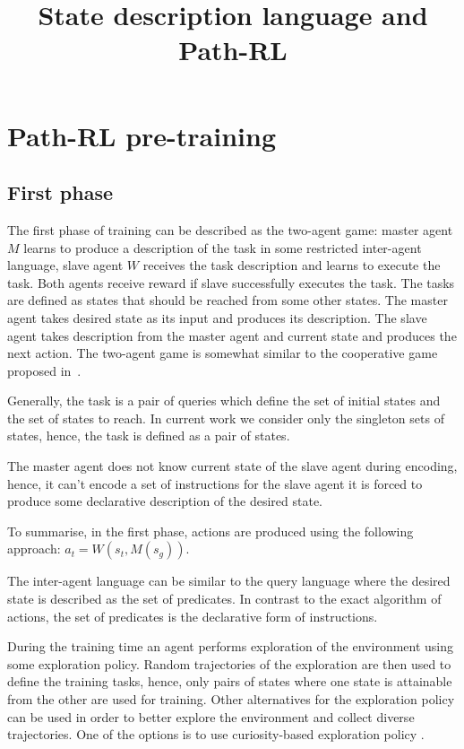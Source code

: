 \documentclass{article}
\title{State description language and Path-RL}
\author{}
\date{}
\begin{document}
\maketitle

\section{Path-RL pre-training}

\subsection{First phase}

The first phase of training can be described as the two-agent game: master agent $M$ learns to produce a description of the task in some restricted inter-agent language, slave agent $W$ receives the task description and learns to execute the task. Both agents receive reward if slave successfully executes the task. The tasks are defined as states that should be reached from some other states. The master agent takes desired state as its input and produces its description. The slave agent takes description from the master agent and current state and produces the next action. The two-agent game is somewhat similar to the cooperative game proposed in~\citep{Mordatch2018EmergenceOG}.

Generally, the task is a pair of queries which define the set of initial states and the set of states to reach. In current work we consider only the singleton sets of states, hence, the task is defined as a pair of states.

The master agent does not know current state of the slave agent during encoding, hence, it can't encode a set of instructions for the slave agent it is forced to produce some declarative description of the desired state.

To summarise, in the first phase, actions are produced using the following approach: $a_t = W(s_t, M(s_g))$.

The inter-agent language can be similar to the query language where the desired state is described as the set of predicates. In contrast to the exact algorithm of actions, the set of predicates is the declarative form of instructions.

During the training time an agent performs exploration of the environment using some exploration policy. Random trajectories of the exploration are then used to define the training tasks, hence, only pairs of states where one state is attainable from the other are used for training. Other alternatives for the exploration policy can be used in order to better explore the environment and collect diverse trajectories. One of the options is to use curiosity-based exploration policy \citep{Pathak2017CuriosityDrivenEB, Burda2019ExplorationBR}.
\end{document}
